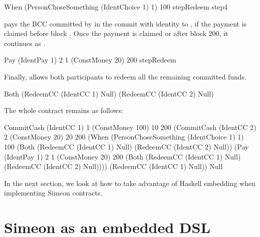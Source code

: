 \documentclass[runningheads]{llncs}
\begin{document}
{\begin{haskellcode}
When (PersonChoseSomething (IdentChoice 1) 1) 100
     stepRedeem
     step4
\end{haskellcode}

 pays the  BCC committed by  in the commit with 
identity  to , if the payment is claimed before block 
. Once the payment is claimed or after block 200, it continues as .

\begin{haskellcode}
Pay (IdentPay 1) 2 1 (ConstMoney 20) 200 stepRedeem
\end{haskellcode}

Finally,  allows both participants to redeem all the remaining committed funds.

\begin{haskellcode}
Both (RedeemCC (IdentCC 1) Null)
     (RedeemCC (IdentCC 2) Null)
\end{haskellcode}

The whole contract remains as follows:
\begin{haskellcode}
CommitCash (IdentCC 1) 1
           (ConstMoney 100)
           10 200
           (CommitCash (IdentCC 2) 2
                       (ConstMoney 20)
                       20 200
                       (When (PersonChoseSomething (IdentChoice 1) 1)
                             100
                             (Both (RedeemCC (IdentCC 1) Null)
                                   (RedeemCC (IdentCC 2) Null))
                             (Pay (IdentPay 1) 2 1
                                  (ConstMoney 20)
                                  200
                                  (Both (RedeemCC (IdentCC 1) Null)
                                        (RedeemCC (IdentCC 2) Null))))
                       (RedeemCC (IdentCC 1) Null))
           Null
\end{haskellcode}

In the next section, we look at how to take advantage of Haskell embedding when implementing Simeon contracts.


} %

\section{Simeon as an embedded DSL}
\label{section:example-escrow}
\end{document}
